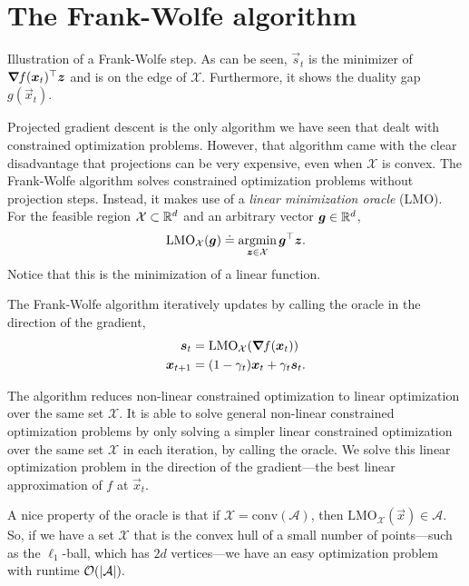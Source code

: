\section{The Frank-Wolfe algorithm}

\begin{marginfigure}
    \centering
    \caption{Illustration of a Frank-Wolfe step. As can be seen, $\vec{s}_t$ is the minimizer of $\bm{\nabla}_{\! } f(\bm{x}_t)^\top\bm{z}$ and is on the edge of $\mathcal{X}$. Furthermore, it shows the duality gap $g(\vec{x}_t)$.}
    \label{fig:frank-wolfe}
\end{marginfigure}

Projected gradient descent is the only algorithm we have seen that dealt with constrained
optimization problems. However, that algorithm came with the clear disadvantage that projections
can be very expensive, even when $\mathcal{X}$ is convex. The Frank-Wolfe algorithm solves
constrained optimization problems without projection steps. Instead, it makes use of a
\textit{linear minimization oracle} (LMO). For the feasible region $\mathcal{X} \subset \mathbb{R}^d$ and
an arbitrary vector $\bm{g} \in \mathbb{R}^d$, \[
    \mathrm{LMO}_{\mathcal{X}}(\bm{g}) \doteq \operatorname*{argmin}_{\bm{z} \in \mathcal{X}} \bm{g}^\top \bm{z}.
\]
Notice that this is the minimization of a linear function.

The Frank-Wolfe algorithm iteratively updates by calling the oracle in the direction of the
gradient,
\begin{align*}
    \bm{s}_t     & = \mathrm{LMO}_{\mathcal{X}}(\bm{\nabla}_{\! } f(\bm{x}_t)) \\
    \bm{x}_{t+1} & = (1- \gamma_t) \bm{x}_t + \gamma_t \bm{s}_t.
\end{align*}

The algorithm reduces non-linear constrained optimization to linear optimization over the same set
$\mathcal{X}$. It is able to solve general non-linear constrained optimization problems by only
solving a simpler linear constrained optimization over the same set $\mathcal{X}$ in each
iteration, by calling the oracle. We solve this linear optimization problem in the direction of the
gradient---the best linear approximation of $f$ at $\vec{x}_t$.

A nice property of the oracle is that if $\mathcal{X} = \mathrm{conv}(\mathcal{A})$, then
$\mathrm{LMO}_{\mathcal{X}}(\vec{x}) \in \mathcal{A}$. So, if we have a set $\mathcal{X}$ that is
the convex hull of a small number of points---such as the $\ell_1$-ball, which has $2d$
vertices---we have an easy optimization problem with runtime $\bigo{|\mathcal{A}|}.$

